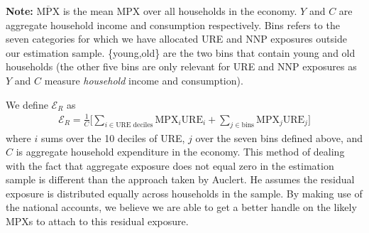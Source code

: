 \documentclass[titlepage]{\econtex}\newcommand{\texname}{ConsumptionHeterogeneity}
\begin{document}
	\begin{minipage}{1.0\textwidth}
	\begin{center}
		\label{table:auclertSS}
		\tiny \textbf{Note: } $\overline{\text{MPX}}$ is the mean MPX over all households in the economy. $Y$ and $C$ are aggregate household income and consumption respectively. Bins refers to the seven categories for which we have allocated URE and NNP exposures outside our estimation sample. \{young,old\} are the two bins that contain young and old households (the other five bins are only relevant for URE and NNP exposures as $Y$ and $C$ measure \textit{household} income and consumption).\\
	\end{center}
	\end{minipage}


	We define $\mathcal{E}_R$ as
	\begin{align}
	\mathcal{E}_R = \frac{1}{C}\Bigg[ \sum_{i \in \text{URE deciles} } \text{MPX}_i \text{URE}_i + \sum_{j \in \text{bins}} \text{MPX}_j \text{URE}_j \Bigg]
	\end{align}
	where $i$ sums over the 10 deciles of URE, $j$ over the seven bins defined above, and $C$ is aggregate household expenditure in the economy. This method of dealing with the fact that aggregate exposure does not equal zero in the estimation sample is different than the approach taken by Auclert. He assumes the residual exposure is distributed equally across households in the sample. By making use of the national accounts, we believe we are able to get a better handle on the likely MPXs to attach to this residual exposure.
\end{document}
